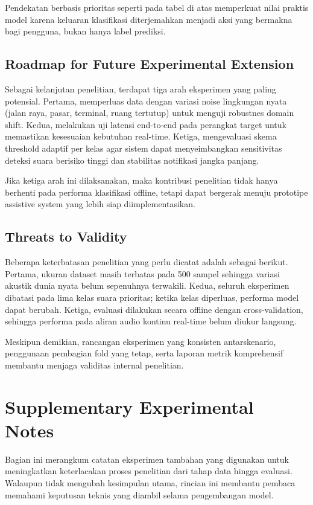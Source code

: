 \documentclass[10pt,a4paper]{jurnalvarian}
\let\LaTeXsection\section
\let\LaTeXsubsection\subsection
\def\section{\setlength{\leftskip}{0cm}\LaTeXsection}
\def\subsection{\setlength{\leftskip}{0.6cm}\LaTeXsubsection}
\begin{document}
Pendekatan berbasis prioritas seperti pada tabel di atas memperkuat nilai praktis model karena keluaran klasifikasi diterjemahkan menjadi aksi yang bermakna bagi pengguna, bukan hanya label prediksi.

\subsection{Roadmap for Future Experimental Extension}
Sebagai kelanjutan penelitian, terdapat tiga arah eksperimen yang paling potensial. Pertama, memperluas data dengan variasi noise lingkungan nyata (jalan raya, pasar, terminal, ruang tertutup) untuk menguji robustnes domain shift. Kedua, melakukan uji latensi end-to-end pada perangkat target untuk memastikan kesesuaian kebutuhan real-time. Ketiga, mengevaluasi skema threshold adaptif per kelas agar sistem dapat menyeimbangkan sensitivitas deteksi suara berisiko tinggi dan stabilitas notifikasi jangka panjang.

Jika ketiga arah ini dilaksanakan, maka kontribusi penelitian tidak hanya berhenti pada performa klasifikasi offline, tetapi dapat bergerak menuju prototipe assistive system yang lebih siap diimplementasikan.

\subsection{Threats to Validity}
Beberapa keterbatasan penelitian yang perlu dicatat adalah sebagai berikut. Pertama, ukuran dataset masih terbatas pada 500 sampel sehingga variasi akustik dunia nyata belum sepenuhnya terwakili. Kedua, seluruh eksperimen dibatasi pada lima kelas suara prioritas; ketika kelas diperluas, performa model dapat berubah. Ketiga, evaluasi dilakukan secara offline dengan cross-validation, sehingga performa pada aliran audio kontinu real-time belum diukur langsung.

Meskipun demikian, rancangan eksperimen yang konsisten antarskenario, penggunaan pembagian fold yang tetap, serta laporan metrik komprehensif membantu menjaga validitas internal penelitian.

\section{Supplementary Experimental Notes}
Bagian ini merangkum catatan eksperimen tambahan yang digunakan untuk meningkatkan keterlacakan proses penelitian dari tahap data hingga evaluasi. Walaupun tidak mengubah kesimpulan utama, rincian ini membantu pembaca memahami keputusan teknis yang diambil selama pengembangan model.
\end{document}
